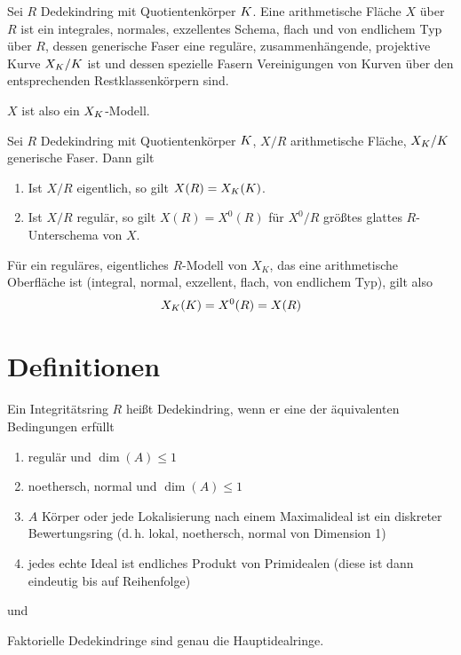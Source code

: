 \documentclass[german]{scrreprt}
\begin{document}
\begin{Definition}
  Sei $R$ Dedekindring mit Quotientenkörper $K$.
  Eine arithmetische Fläche $X$ über $R$ ist ein
  integrales, normales, exzellentes Schema, flach und von endlichem
  Typ über $R$,
  dessen generische Faser eine reguläre, zusammenhängende,
  projektive Kurve $X_{K}/K$ ist
  und dessen spezielle Fasern Vereinigungen von Kurven über den
  entsprechenden Restklassenkörpern sind.
  \cite[IV.4]{silverman2}
  
  $X$ ist also ein $X_{K}$-Modell.
\end{Definition}

\begin{Satz}
  Sei $R$ Dedekindring mit Quotientenkörper $K$,
  $X/R$ arithmetische Fläche, $X_{K}/K$ generische Faser.
  Dann gilt
  \begin{enumerate}[label=(\roman*)]
  \item Ist $X/R$ eigentlich, so gilt $X(R)=X_{K}(K)$.
  \item Ist $X/R$ regulär, so gilt $X(R)=X^0(R)$ für $X^0/R$ größtes
    glattes $R$-Unterschema von $X$.
  \end{enumerate}
  \cite[Corollary IV.4.4]{silverman2}

  Für ein reguläres, eigentliches $R$-Modell von $X_K$, das eine
  arithmetische Oberfläche ist (integral, normal, exzellent, flach,
  von endlichem Typ), gilt also
  \begin{gather*}
    X_{K}(K)=X^0(R)=X(R)
  \end{gather*}
\end{Satz}



\appendix
\chapter{Definitionen}
\begin{Definition}[Dedekindring]
Ein Integritätsring $R$ heißt Dedekindring, wenn er eine der
äquivalenten Bedingungen erfüllt
\begin{enumerate}[label=(\roman*)]
\item regulär und $\dim(A)\leq 1$
\item noethersch, normal und $\dim(A)\leq 1$
\item $A$ Körper oder
  jede Lokalisierung nach einem Maximalideal ist ein diskreter
  Bewertungsring
  (d.\,h. lokal, noethersch, normal von Dimension 1)
\item jedes echte Ideal ist endliches Produkt von Primidealen
  (diese ist dann eindeutig bis auf Reihenfolge) 
\end{enumerate}
\cite[S.\,40]{hartshorne} und \cite[Definition B.84]{wedhorn}

Faktorielle Dedekindringe sind genau die Hauptidealringe.
\cite[Proposition B.85]{wedhorn}
\end{Definition}
\end{document}
